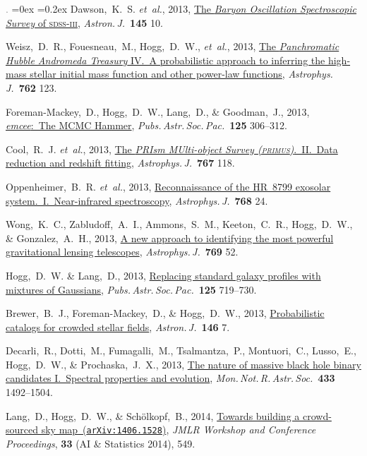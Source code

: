 \documentclass[12pt,letterpaper]{article}
\newcommand{\latin}[1]{\textsl{#1}}
\newcommand{\etal}{\latin{et~al.}}
\newcommand{\project}[1]{\textsl{#1}}
\newcommand{\doi}[2]{\href{http://dx.doi.org/#1}{{#2}}}
\newcommand{\arxiv}[2]{\href{http://arxiv.org/abs/#1}{{#2}\ (\texttt{arXiv:#1})}}
\newcommand{\deemph}[1]{\textcolor{grey}{\footnotesize{#1}}}
\newcommand{\pubnumber}[1]{\deemph{{#1}.}}
\newcounter{refpubnum}
\newcommand{\hogglist}{%
    \rightmargin=0in
    \leftmargin=0.18in
    \topsep=0ex
    \partopsep=0pt
    \itemsep=0.2ex
    \parsep=0pt
    \itemindent=-1.0\leftmargin
    \listparindent=0.0\leftmargin
    \settowidth{\labelsep}{~}
    \usecounter{refpubnum}
  }
\begin{document}
\begin{list}{\pubnumber{\therefpubnum}}{\hogglist}
Dawson,~K.~S. \etal, 2013,
\doi{10.1088/0004-6256/145/1/10}{The \project{Baryon Oscillation Spectroscopic Survey} of \textsc{sdss-iii}},
\textit{Astron.\,J.}\ \textbf{145} 10.
\item
Weisz,~D.~R., Fouesneau,~M., Hogg,~D.~W., \etal, 2013,
\doi{10.1088/0004-637X/762/2/123}{The \project{Panchromatic Hubble Andromeda Treasury} IV.\ A probabilistic approach to inferring the high-mass stellar initial mass function and other power-law functions},
\textit{Astrophys.\,J.}\ \textbf{762} 123.
\item
Foreman-Mackey,~D., Hogg,~D.~W., Lang,~D., \& Goodman,~J., 2013,
\doi{10.1086/670067}{\project{emcee}:\ The MCMC Hammer},
\textit{Pubs.\,Astr.\,Soc.\,Pac.}\ \textbf{125} 306--312.
\item
Cool,~R.~J. \etal, 2013,
\doi{10.1088/0004-637X/767/2/118}{The \project{PRIsm MUlti-object Survey (\textsc{primus})}.\ II.\ Data reduction and redshift fitting},
\textit{Astrophys.\,J.}\ \textbf{767} 118.
\item
Oppenheimer,~B.~R. \etal, 2013,
\doi{10.1088/0004-637X/768/1/24}{Reconnaissance of the HR~8799 exosolar system.\ I.\ Near-infrared spectroscopy},
\textit{Astrophys.\,J.}\ \textbf{768} 24.
\item
Wong,~K.~C., Zabludoff,~A.~I., Ammons,~S.~M., Keeton,~C.~R., Hogg,~D.~W., \& Gonzalez,~A.~H., 2013,
\doi{10.1088/0004-637X/769/1/52}{A new approach to identifying the most powerful gravitational lensing telescopes},
\textit{Astrophys.\,J.}\ \textbf{769} 52.
\item
Hogg,~D.~W. \& Lang,~D., 2013,
\doi{10.1086/671228}{Replacing standard galaxy profiles with mixtures of Gaussians},
\textit{Pubs.\,Astr.\,Soc.\,Pac.}\ \textbf{125} 719--730.
\item
Brewer,~B.~J., Foreman-Mackey,~D., \& Hogg,~D.~W., 2013,
\doi{10.1088/0004-6256/146/1/7}{Probabilistic catalogs for crowded stellar fields},
\textit{Astron.\,J.}\ \textbf{146} 7.
\item
Decarli,~R., Dotti,~M., Fumagalli,~M., Tsalmantza,~P., Montuori,~C., Lusso,~E.,
Hogg,~D.~W., \& Prochaska,~J.~X., 2013,
\doi{10.1093/mnras/stt831}{The nature of massive black hole binary candidates I.\ Spectral properties and evolution},
\textit{Mon.\,Not.\,R.\,Astr.\,Soc.}\ \textbf{433} 1492--1504.
\item
Lang,~D., Hogg,~D.~W., \& Sch\"olkopf,~B., 2014,
\arxiv{1406.1528}{Towards building a crowd-sourced sky map},
\textit{JMLR Workshop and Conference Proceedings}, \textbf{33} (AI \& Statistics 2014), 549.
\item

\end{list}
\end{document}
